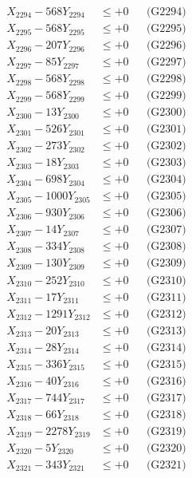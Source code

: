 \documentclass[a4paper,10pt]{article}
\begin{document}
{\begin{align}
X_{2294} - 568Y_{2294} &\leq +0 && \text{(G2294)} \\
X_{2295} - 568Y_{2295} &\leq +0 && \text{(G2295)} \\
X_{2296} - 207Y_{2296} &\leq +0 && \text{(G2296)} \\
X_{2297} - 85Y_{2297} &\leq +0 && \text{(G2297)} \\
X_{2298} - 568Y_{2298} &\leq +0 && \text{(G2298)} \\
X_{2299} - 568Y_{2299} &\leq +0 && \text{(G2299)} \\
X_{2300} - 13Y_{2300} &\leq +0 && \text{(G2300)} \\
\allowbreak
X_{2301} - 526Y_{2301} &\leq +0 && \text{(G2301)} \\
X_{2302} - 273Y_{2302} &\leq +0 && \text{(G2302)} \\
X_{2303} - 18Y_{2303} &\leq +0 && \text{(G2303)} \\
X_{2304} - 698Y_{2304} &\leq +0 && \text{(G2304)} \\
X_{2305} - 1000Y_{2305} &\leq +0 && \text{(G2305)} \\
X_{2306} - 930Y_{2306} &\leq +0 && \text{(G2306)} \\
X_{2307} - 14Y_{2307} &\leq +0 && \text{(G2307)} \\
X_{2308} - 334Y_{2308} &\leq +0 && \text{(G2308)} \\
X_{2309} - 130Y_{2309} &\leq +0 && \text{(G2309)} \\
X_{2310} - 252Y_{2310} &\leq +0 && \text{(G2310)} \\
\allowbreak
X_{2311} - 17Y_{2311} &\leq +0 && \text{(G2311)} \\
X_{2312} - 1291Y_{2312} &\leq +0 && \text{(G2312)} \\
X_{2313} - 20Y_{2313} &\leq +0 && \text{(G2313)} \\
X_{2314} - 28Y_{2314} &\leq +0 && \text{(G2314)} \\
X_{2315} - 336Y_{2315} &\leq +0 && \text{(G2315)} \\
X_{2316} - 40Y_{2316} &\leq +0 && \text{(G2316)} \\
X_{2317} - 744Y_{2317} &\leq +0 && \text{(G2317)} \\
X_{2318} - 66Y_{2318} &\leq +0 && \text{(G2318)} \\
X_{2319} - 2278Y_{2319} &\leq +0 && \text{(G2319)} \\
X_{2320} - 5Y_{2320} &\leq +0 && \text{(G2320)} \\
\allowbreak
X_{2321} - 343Y_{2321} &\leq +0 && \text{(G2321)} \\

\end{align}}
\end{document}
